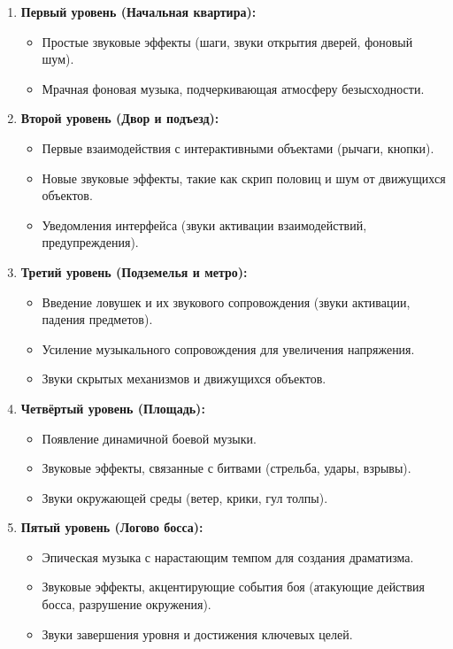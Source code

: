 \documentclass[12pt]{article}
\begin{document}
\begin{enumerate}
    \item \textbf{Первый уровень (Начальная квартира):}
    \begin{itemize}
        \item Простые звуковые эффекты (шаги, звуки открытия дверей, фоновый шум).
        \item Мрачная фоновая музыка, подчеркивающая атмосферу безысходности.
    \end{itemize}
    
    \item \textbf{Второй уровень (Двор и подъезд):}
    \begin{itemize}
        \item Первые взаимодействия с интерактивными объектами (рычаги, кнопки).
        \item Новые звуковые эффекты, такие как скрип половиц и шум от движущихся объектов.
        \item Уведомления интерфейса (звуки активации взаимодействий, предупреждения).
    \end{itemize}
    
    \item \textbf{Третий уровень (Подземелья и метро):}
    \begin{itemize}
        \item Введение ловушек и их звукового сопровождения (звуки активации, падения предметов).
        \item Усиление музыкального сопровождения для увеличения напряжения.
        \item Звуки скрытых механизмов и движущихся объектов.
    \end{itemize}
    
    \item \textbf{Четвёртый уровень (Площадь):}
    \begin{itemize}
        \item Появление динамичной боевой музыки.
        \item Звуковые эффекты, связанные с битвами (стрельба, удары, взрывы).
        \item Звуки окружающей среды (ветер, крики, гул толпы).
    \end{itemize}
    
    \item \textbf{Пятый уровень (Логово босса):}
    \begin{itemize}
        \item Эпическая музыка с нарастающим темпом для создания драматизма.
        \item Звуковые эффекты, акцентирующие события боя (атакующие действия босса, разрушение окружения).
        \item Звуки завершения уровня и достижения ключевых целей.
    \end{itemize}
    

\end{enumerate}
\end{document}
